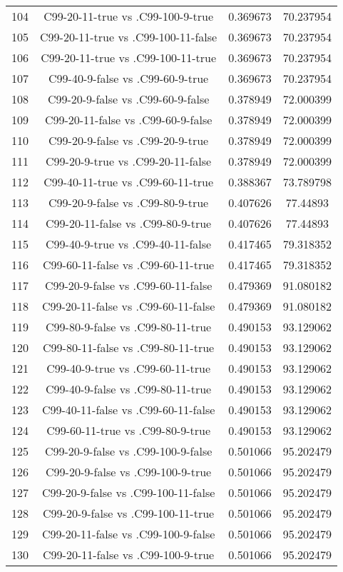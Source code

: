 \documentclass[a4paper,10pt]{article}
\begin{document}
\begin{landscape}
\begin{table}[!htp]
\begin{tabular}{cccc}
104&C99-20-11-true vs .C99-100-9-true&0.369673&70.237954\\
105&C99-20-11-true vs .C99-100-11-false&0.369673&70.237954\\
106&C99-20-11-true vs .C99-100-11-true&0.369673&70.237954\\
107&C99-40-9-false vs .C99-60-9-true&0.369673&70.237954\\
108&C99-20-9-false vs .C99-60-9-false&0.378949&72.000399\\
109&C99-20-11-false vs .C99-60-9-false&0.378949&72.000399\\
110&C99-20-9-false vs .C99-20-9-true&0.378949&72.000399\\
111&C99-20-9-true vs .C99-20-11-false&0.378949&72.000399\\
112&C99-40-11-true vs .C99-60-11-true&0.388367&73.789798\\
113&C99-20-9-false vs .C99-80-9-true&0.407626&77.44893\\
114&C99-20-11-false vs .C99-80-9-true&0.407626&77.44893\\
115&C99-40-9-true vs .C99-40-11-false&0.417465&79.318352\\
116&C99-60-11-false vs .C99-60-11-true&0.417465&79.318352\\
117&C99-20-9-false vs .C99-60-11-false&0.479369&91.080182\\
118&C99-20-11-false vs .C99-60-11-false&0.479369&91.080182\\
119&C99-80-9-false vs .C99-80-11-true&0.490153&93.129062\\
120&C99-80-11-false vs .C99-80-11-true&0.490153&93.129062\\
121&C99-40-9-true vs .C99-60-11-true&0.490153&93.129062\\
122&C99-40-9-false vs .C99-80-11-true&0.490153&93.129062\\
123&C99-40-11-false vs .C99-60-11-false&0.490153&93.129062\\
124&C99-60-11-true vs .C99-80-9-true&0.490153&93.129062\\
125&C99-20-9-false vs .C99-100-9-false&0.501066&95.202479\\
126&C99-20-9-false vs .C99-100-9-true&0.501066&95.202479\\
127&C99-20-9-false vs .C99-100-11-false&0.501066&95.202479\\
128&C99-20-9-false vs .C99-100-11-true&0.501066&95.202479\\
129&C99-20-11-false vs .C99-100-9-false&0.501066&95.202479\\
130&C99-20-11-false vs .C99-100-9-true&0.501066&95.202479\\

\end{tabular}
\end{table}
\end{landscape}
\end{document}
